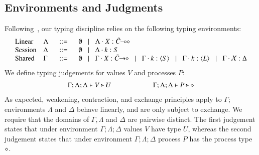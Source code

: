 

\subsection{Environments and Judgments}
%
Following~\cite{tlca07}, 
our typing discipline relies on the following typing environments: %
\[
\begin{array}{llcl}
	\text{Linear} & \Lambda & \bnfis & \emptyset \bnfbar \Lambda \cat \varp{X}: \lhot{\tilde{C}}\\
	\text{Session} & \Delta & \bnfis & \emptyset \bnfbar \Delta \cat k:S \\
	\text{Shared} & \Gamma & \bnfis & \emptyset \bnfbar \Gamma \cat \varp{X}: \shot{\tilde{C}} \bnfbar \Gamma \cat k: \chtype{S} \bnfbar \Gamma \cat k: \chtype{L} \bnfbar \Gamma \cat \rvar{X}: \Delta
\end{array}
\]
%
\noi We define typing judgements for values $V$
and processes $P$: %
%
\[	\begin{array}{c}
		\Gamma; \Lambda; \Delta \vdash V \triangleright U \qquad \qquad \qquad \Gamma; \Lambda; \Delta \vdash P \triangleright \diamond
	\end{array}
\]
%
\noi As expected, weakening, contraction, and exchange principles apply to $\Gamma$;
environments $\Lambda$ and $\Delta$ behave linearly, and are only subject to exchange.
We require that the domains of $\Gamma, \Lambda$ and $\Delta$ are pairwise distinct.
The first judgement states that under environment $\Gamma; \Lambda; \Delta$
values $V$ have type $U$,
whereas the second judgement states that under environment $\Gamma; \Lambda; \Delta$
process $P$ has the process type $\diamond$.



